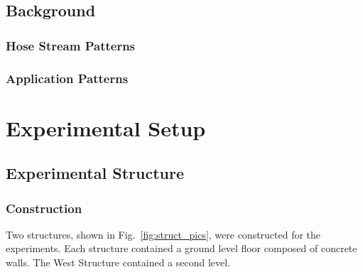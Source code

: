 \documentclass[12pt,oneside]{book}
\begin{document}
\section{Background}
\label{sec:Background}

\subsection{Hose Stream Patterns}
\label{sec:Hose_Stream_Patterns}

\subsection{Application Patterns}
\label{Application_Patterns}

\chapter{Experimental Setup}
\label{chap:Experimental_Setup}

\section{Experimental Structure}
\label{sec:Experimental_Structure}

\subsection{Construction}
\label{sec:Construction}
Two structures, shown in Fig.~\ref{fig:struct_pics}, were constructed for the experiments. Each structure contained a ground level floor composed of concrete walls. The West Structure contained a second level.
\end{document}
